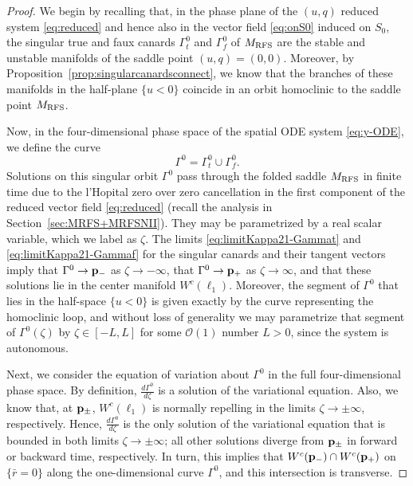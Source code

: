 \documentclass[11pt]{article}
\numberwithin{equation}{section}
\begin{document}
\begin{proof}
We begin by recalling that, in the phase plane of the $(u,q)$ reduced system \eqref{eq:reduced} and hence also in the vector field \eqref{eq:onS0} induced on $S_0$, the singular true and faux canards $\Gamma_t^0$ and $\Gamma_f^0$ of $M_{\rm RFS}$ are the stable and unstable manifolds of the saddle point $(u,q)=(0,0)$.
Moreover, by Proposition~\ref{prop:singularcanardsconnect}, we know that the branches of these manifolds in the half-plane $\{ u<0\}$ coincide in an orbit homoclinic to the saddle point $M_{\rm RFS}$.

Now, in the four-dimensional phase space of the spatial ODE system \eqref{eq:y-ODE}, we define the curve 
\begin{equation}\label{eq:Gamma}
\Gamma^0 = \Gamma_t^0 \cup \Gamma_f^0.
\end{equation}
Solutions on this singular orbit $\Gamma^0$ pass through the folded saddle $M_{\rm RFS}$ in finite time due to the l'Hopital zero over zero cancellation in the first component of the reduced vector field \eqref{eq:reduced} (recall the analysis in Section~\ref{sec:MRFS+MRFSNII}).
They may be parametrized by a real scalar variable, which we label as $\zeta$.
The limits \eqref{eq:limitKappa21-Gammat} and \eqref{eq:limitKappa21-Gammaf} for the singular canards and their tangent vectors imply that $\Gamma^0 \to {\bf p}_-$ as $\zeta \to -\infty$, that $\Gamma^0 \to {\bf p}_+$ as $\zeta \to \infty$, and that these solutions lie in the center manifold $W^c(\ell_1)$. 
Moreover, the segment of $\Gamma^0$ that lies in the half-space $\{ u < 0 \}$ is given exactly by the curve representing the homoclinic loop,
and without loss of generality we may parametrize that segment of $\Gamma^0(\zeta)$ by $\zeta \in [-L,L]$ for some $\mathcal{O}(1)$ number $L>0$, since the system is autonomous.

Next, we consider the equation of variation about $\Gamma^0$ in the full four-dimensional phase space. 
By definition, $\tfrac{d\Gamma^0}{d \zeta}$ is a solution of the variational equation.
Also, we know that, at ${\bf p}_\pm$, $W^c(\ell_1)$ is normally 
repelling in the limits $\zeta \to \pm \infty$, respectively.
Hence, $\tfrac{d\Gamma^0}{d\zeta}$ is the only solution
of the variational equation that is bounded in both limits $\zeta \to \pm \infty$;
all other solutions diverge from ${\bf p}_\pm$ in forward or backward time, respectively.
In turn, this implies that $W^c({\bf p}_-) \cap W^c({\bf p}_+)$ on $\{ \bar r = 0 \}$ along the one-dimensional curve $\Gamma^0$, and this intersection is transverse.


\end{proof}
\end{document}

